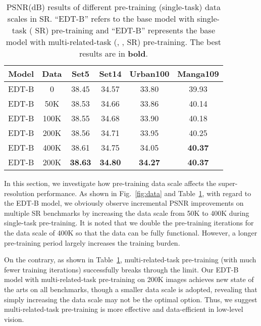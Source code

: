 \documentclass[runningheads]{llncs}
\begin{document}
	
	\begin{table}[t]
		\caption{PSNR(dB) results of different pre-training (single-task) data scales in  SR. ``EDT-B'' refers to the base model with single-task ( SR) pre-training and ``EDT-B'' represents the base model with multi-related-task (, ,  SR) pre-training. The best results are in \textbf{bold}.}
\setlength\tabcolsep{5pt}
		\begin{center}
\begin{tabular}{| c | c | c  c  c  c |}
				\hline
				Model & Data & Set5 & Set14 & Urban100 & Manga109 \\
				\hline
				EDT-B & 0 & 38.45 & 34.57 & 33.80 & 39.93 \\
				EDT-B & 50K & 38.53 & 34.66 & 33.86 & 40.14 \\
				EDT-B & 100K & 38.55 & 34.68 & 33.90 & 40.18  \\
				EDT-B & 200K & 38.56 & 34.71 & 33.95 & 40.25 \\
				EDT-B & 400K & 38.61 & 34.75 & 34.05 & \textbf{40.37} \\			
				\hline
				EDT-B & 200K & \textbf{38.63} & \textbf{34.80} & \textbf{34.27} & \textbf{40.37} \\
				\hline
			\end{tabular}
\end{center}
\vspace{-0.1in}
		\label{tab:data}
	\end{table} 
	
In this section, we investigate how pre-training data scale affects the super-resolution performance. As shown in Fig.~\ref{fig:data} and Table~\ref{tab:data}, with regard to the EDT-B model, we obviously observe incremental PSNR improvements on multiple SR benchmarks by increasing the data scale from 50K to 400K during single-task pre-training. It is noted that we double the pre-training iterations for the data scale of 400K so that the data can be fully functional. However, a longer pre-training period largely increases the training burden. 

	On the contrary, as shown in Table~\ref{tab:data}, multi-related-task pre-training (with much fewer training iterations) successfully breaks through the limit. Our EDT-B model with multi-related-task pre-training on 200K images achieves new state of the arts on all benchmarks, though a smaller data scale is adopted, revealing that simply increasing the data scale may not be the optimal option. Thus, we suggest multi-related-task pre-training is more effective and data-efficient in low-level vision.
	
\end{document}
